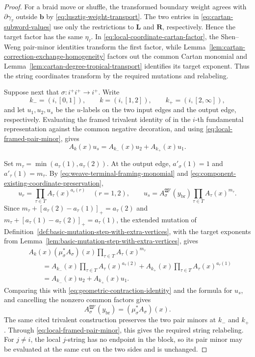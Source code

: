 \documentclass[10pt,a4paper]{article}
\theoremstyle{definition}
\theoremstyle{remark}
\newcommand{\fW}{\mathfrak W}
\begin{document}
\begin{proof}
For a braid move or shuffle, the transformed boundary weight agrees with
\(\partial\gamma_\tau\) outside \(\mathbf b\) by
\eqref{eq:lusztig-weight-transport}.  The two entries in
\eqref{eq:cartan-subword-values} use only the restrictions to
\(\mathbf L\) and \(\mathbf R\), respectively.  Hence the target factor has
the same \(\eta_\tau\).  In \eqref{eq:local-coordinate-cartan-factor}, the
Shen--Weng pair-minor identities
\cite[Proposition~3.25]{ShenWeng2021} transform the first factor, while
Lemma~\ref{lem:cartan-correction-exchange-homogeneity} factors out the common
Cartan monomial and Lemma~\ref{lem:cartan-degree-tropical-transport}
identifies its target exponent.  Thus the string coordinates transform by the
required mutations and relabeling.

Suppose next that \(\sigma:i^+i^+\to i^+\).  Write
\[
 k_-=(i,[0,1]),\qquad k=(i,[1,2]),\qquad k_+=(i,[2,\infty]),
\]
and let \(u_1,u_2,u_s\) be the \(u\)-labels on the two input edges and the
output edge, respectively.  Evaluating the framed trivalent identity of
\cite[Definition~5.8 and Lemma~5.9]{CasalsEtAlBraidVarieties} in the
\(i\)-th fundamental representation against the common negative decoration,
and using \eqref{eq:local-framed-pair-minor}, gives
\begin{equation}
 A_k(x)u_s=A_{k_-}(x)u_2+A_{k_+}(x)u_1.
 \label{eq:geometric-contraction-identity}
\end{equation}

Set \(m_\tau=\min(a_\tau(1),a_\tau(2))\).  At the output edge,
\(a'_\sigma(1)=1\) and \(a'_\tau(1)=m_\tau\).  By
\eqref{eq:weave-terminal-framing-monomial} and
\eqref{eq:component-existing-coordinate-preservation},
\[
 u_r=\prod_{\tau\in T}A_\tau(x)^{a_\tau(r)}\quad(r=1,2),
 \qquad
 u_s=A_\sigma^{\fW'}(y_{\mathrm{br}})
     \prod_{\tau\in T}A_\tau(x)^{m_\tau}.
\]
Since
\(m_\tau+[a_\tau(2)-a_\tau(1)]_+=a_\tau(2)\) and
\(m_\tau+[a_\tau(1)-a_\tau(2)]_+=a_\tau(1)\), the extended mutation of
Definition~\ref{def:basic-mutation-step-with-extra-vertices}, with the target
exponents from Lemma~\ref{lem:basic-mutation-step-with-extra-vertices}, gives
\[
 \begin{aligned}
 &A_k(x)(\mu_\sigma^*A_\sigma)(x)
  \prod_{\tau\in T}A_\tau(x)^{m_\tau}\\
 &\qquad={}
  A_{k_-}(x)\prod_{\tau\in T}A_\tau(x)^{a_\tau(2)}
  +A_{k_+}(x)\prod_{\tau\in T}A_\tau(x)^{a_\tau(1)}\\
 &\qquad={}
  A_{k_-}(x)u_2+A_{k_+}(x)u_1.
 \end{aligned}
\]
Comparing this with \eqref{eq:geometric-contraction-identity} and the formula
for \(u_s\), and cancelling the nonzero common factors gives
\[
 A_\sigma^{\fW'}(y_{\mathrm{br}})
 =(\mu_\sigma^*A_\sigma)(x).
\]
The same cited trivalent construction preserves the two pair minors at
\(k_-\) and \(k_+\).  Through \eqref{eq:local-framed-pair-minor}, this gives
the required string relabeling.
For \(j\ne i\), the local \(j\)-string has no endpoint in the block, so its
pair minor may be evaluated at the same cut on the two sides and is unchanged.


\end{proof}
\end{document}
